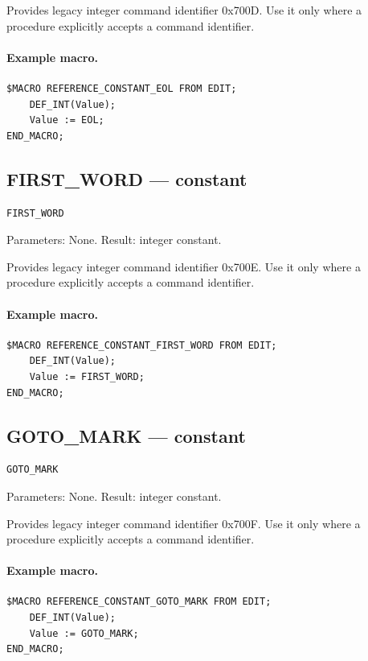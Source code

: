 \documentclass[a4paper,10pt,twoside,openany]{book}
\begin{document}
Provides legacy integer command identifier 0x700D. Use it only where a procedure explicitly accepts a command identifier.

\paragraph{Example macro.}
\begin{verbatim}
$MACRO REFERENCE_CONSTANT_EOL FROM EDIT;
    DEF_INT(Value);
    Value := EOL;
END_MACRO;
\end{verbatim}

\label{prim:constant-first-word}
\subsection*{FIRST\_WORD --- constant}
\begin{verbatim}
FIRST_WORD
\end{verbatim}
Parameters: None. Result: integer constant.

Provides legacy integer command identifier 0x700E. Use it only where a procedure explicitly accepts a command identifier.

\paragraph{Example macro.}
\begin{verbatim}
$MACRO REFERENCE_CONSTANT_FIRST_WORD FROM EDIT;
    DEF_INT(Value);
    Value := FIRST_WORD;
END_MACRO;
\end{verbatim}

\label{prim:constant-goto-mark}
\subsection*{GOTO\_MARK --- constant}
\begin{verbatim}
GOTO_MARK
\end{verbatim}
Parameters: None. Result: integer constant.

Provides legacy integer command identifier 0x700F. Use it only where a procedure explicitly accepts a command identifier.

\paragraph{Example macro.}
\begin{verbatim}
$MACRO REFERENCE_CONSTANT_GOTO_MARK FROM EDIT;
    DEF_INT(Value);
    Value := GOTO_MARK;
END_MACRO;
\end{verbatim}
\end{document}
